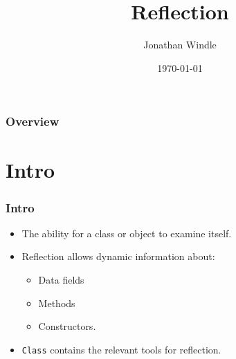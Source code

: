 \documentclass{beamer}
\title[Reflection]{Reflection} %
\author{Jonathan Windle} %
\institute[UEA] %
{
University of East Anglia \\ %
\medskip
\textit{J.Windle@uea.ac.uk} %
}
\date{\today} %
\begin{document}
\begin{frame}
\titlepage %
\end{frame}

\begin{frame}[allowframebreaks]
\frametitle{Overview} %
\tableofcontents %
\end{frame}

\section{Intro}
\begin{frame}
\frametitle{Intro}
\begin{itemize}
\item The ability for a class or object to examine itself.
\item Reflection allows dynamic information about:
\begin{itemize}
\item Data fields
\item Methods
\item Constructors.
\end{itemize}
\item \texttt{\color{red}Class} contains the relevant tools for reflection.
\end{itemize}
\end{frame}
\end{document}
